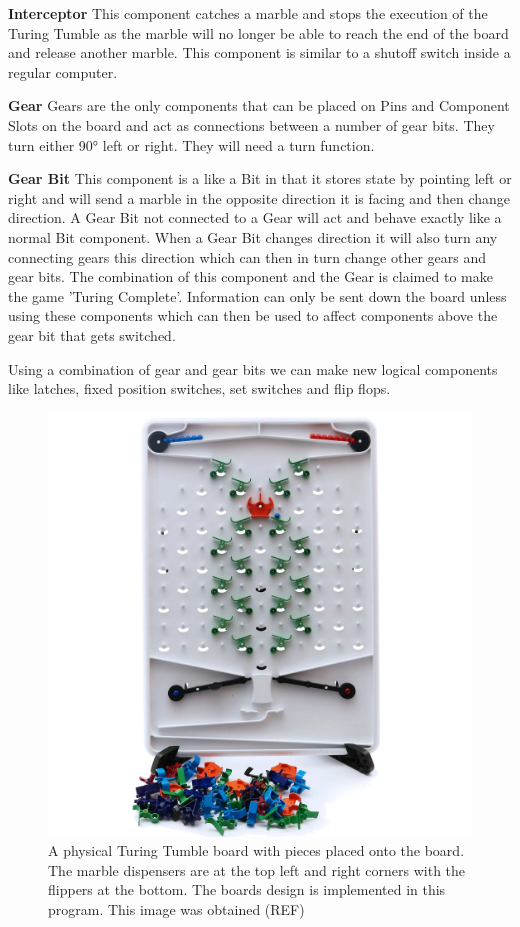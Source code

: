 \documentclass{l4proj}
\begin{document}
\textbf{Interceptor}
This component catches a marble and stops the execution of the Turing Tumble as the marble will no longer be able to reach the end of the board and release another marble. This component is similar to a shutoff switch inside a regular computer. 

\textbf{Gear}
Gears are the only components that can be placed on Pins and Component Slots on the board and act as connections between a number of gear bits. They turn either 90° left or right. They will need a turn function.

\textbf{Gear Bit}
This component is a like a Bit in that it stores state by pointing left or right and will send a marble in the opposite direction it is facing and then change direction. A Gear Bit not connected to a Gear will act and behave exactly like a normal Bit component. When a Gear Bit changes direction it will also turn any connecting gears this direction which can then in turn change other gears and gear bits. The combination of this component and the Gear is claimed to make the game 'Turing Complete'. Information can only be sent down the board unless using these components which can then be used to affect components above the gear bit that gets switched.

Using a combination of gear and gear bits we can make new logical components like latches, fixed position switches, set switches and flip flops.

\begin{figure}
    \centering
    \includegraphics[width=0.7\linewidth]{images/turingTumbleBoard.png}
    \caption{A physical Turing Tumble board with pieces placed onto the board. The marble dispensers are at the top left and right corners with the flippers at the bottom. The boards design is implemented in this program. This image was obtained (REF)}
    \label{fig:ttboard}
\end{figure}
\end{document}
